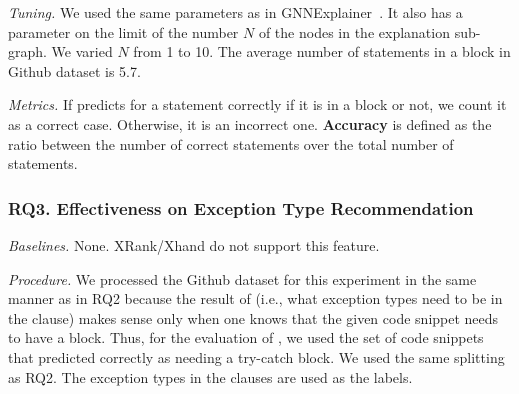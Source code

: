{\em Tuning.} We used the same parameters as in
GNNExplainer~\cite{GNNExplainer}. It also has a parameter on the limit
of the number $N$ of the nodes in the explanation sub-graph. We
varied $N$ from 1 to 10. The average number of statements in a
 block in Github dataset is 5.7.


{\em Metrics.} If {\xstate} predicts for a statement correctly if it
is in a  block or not, we count it as a correct case.
Otherwise, it is an incorrect one. \textbf{Accuracy} is
defined as the ratio between the number of correct statements over the
total number of statements.


\subsubsection{RQ3. Effectiveness on Exception Type Recommendation\\}

{\em Baselines.} None. XRank/Xhand do not support this feature.


{\em Procedure.} We processed the Github dataset for this experiment
in the same manner as in RQ2 because the result of {\xtype} (i.e.,
what exception types need to be in the  clause) makes
sense only when one knows that the given code snippet needs to have a
 block. Thus, for the evaluation of {\xtype}, we used
the set of code snippets that {\xblock} predicted correctly as needing
a try-catch block. We used the same splitting as RQ2. The exception
types in the  clauses are used as the labels.



